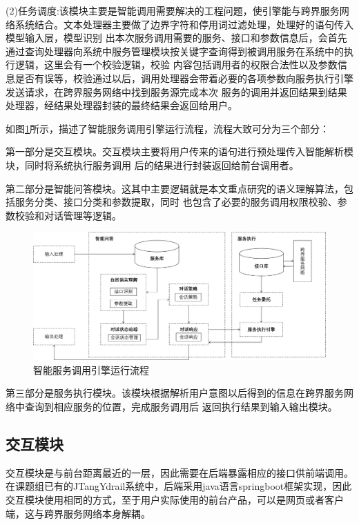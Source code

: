 (2)任务调度:该模块主要是智能调用需要解决的工程问题，使引擎能与跨界服务网络系统结合。文本处理器主要做了边界字符和停用词过滤处理，处理好的语句传入模型输入层，模型识别
出本次服务调用需要的服务、接口和参数信息后，会首先通过查询处理器向系统中服务管理模块按关键字查询得到被调用服务在系统中的执行逻辑，这里会有一个校验逻辑，校验
内容包括调用者的权限合法性以及参数信息是否有误等，校验通过以后，调用处理器会带着必要的各项参数向服务执行引擎发送请求，在跨界服务网络中找到服务源完成本次
服务的调用并返回结果到结果处理器，经结果处理器封装的最终结果会返回给用户。

如图\ref{fig:yinqinliucheng}所示，描述了智能服务调用引擎运行流程，流程大致可分为三个部分：

第一部分是交互模块。交互模块主要将用户传来的语句进行预处理传入智能解析模块，同时将系统执行服务调用
后的结果进行封装返回给前台调用者。

第二部分是智能问答模块。这其中主要逻辑就是本文重点研究的语义理解算法，包括服务分类、接口分类和参数提取，同时
也包含了必要的服务调用权限校验、参数校验和对话管理等逻辑。

\begin{figure}[htbp]
  \centering
  \includegraphics[width=15cm]{./images/yinqinliucheng.png}
  \caption{智能服务调用引擎运行流程}
  \label{fig:yinqinliucheng}
\end{figure}

第三部分是服务执行模块。该模块根据解析用户意图以后得到的信息在跨界服务网络中查询到相应服务的位置，完成服务调用后
返回执行结果到输入输出模块。

\subsection{交互模块}
交互模块是与前台距离最近的一层，因此需要在后端暴露相应的接口供前端调用。在课题组已有的JTangYdrail系统中，后端采用java语言springboot框架实现，因此
交互模块使用相同的方式，至于用户实际使用的前台产品，可以是网页或者客户端，这与跨界服务网络本身解耦。

